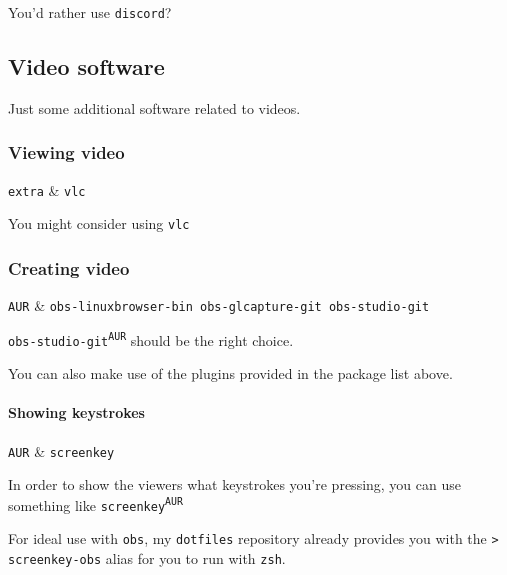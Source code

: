 \documentclass[10pt]{dustdoc}
\begin{document}
You’d rather use \texttt{discord}?

\subsection{Video software}%
\label{sec:gui-video-software}

Just some additional software related to videos.

\subsubsection{Viewing video}%
\label{sec:viewing-video}

\begin{pkgtable}
    \texttt{extra} & \texttt{vlc} \\
\end{pkgtable}

You might consider using \texttt{vlc}

\subsubsection{Creating video}%
\label{sec:creating-video}

\begin{pkgtable}
    \texttt{AUR} & \texttt{obs-linuxbrowser-bin obs-glcapture-git obs-studio-git} \\
\end{pkgtable}

\texttt{obs-studio-git\textsuperscript{\texttt{AUR}}} should be the right choice.

You can also make use of the plugins provided in the package list above.

\paragraph{Showing keystrokes}%
\label{par:showing-keystrokes}

\begin{pkgtable}
    \texttt{AUR} & \texttt{screenkey} \\
\end{pkgtable}

In order to show the viewers what keystrokes you’re pressing, you can use something like \texttt{screenkey\textsuperscript{\texttt{AUR}}}

\begin{NOTE}
    For ideal use with \texttt{obs}, my \texttt{dotfiles} repository already provides you with the \texttt{> screenkey-obs} alias for you to run with \texttt{zsh}.

\end{NOTE}
\end{document}
